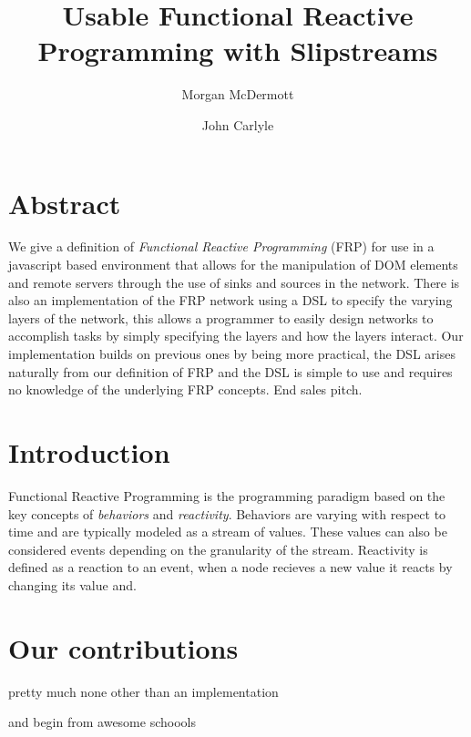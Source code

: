 \documentclass[twocolumn]{paper}
\title{Usable Functional Reactive Programming with Slipstreams}
\author[*]{Morgan McDermott}
\author[**]{John Carlyle}
\affil[*]{University of flightless dragons}
\affil[**]{University of angry bees}
\begin{document}
\maketitle
\section{Abstract}
We give a definition of \textit{Functional Reactive Programming} (FRP) for use in a javascript based environment that allows for the manipulation of DOM elements and remote servers through the use of sinks and sources in the network. There is also an implementation of the FRP network using a DSL to specify the varying layers of the network, this allows a programmer to easily design networks to accomplish tasks by simply specifying the layers and how the layers interact. Our implementation builds on previous ones by being more practical, the DSL arises naturally from our definition of FRP and the DSL is simple to use and requires no knowledge of the underlying FRP concepts. End sales pitch.

\section{Introduction}
Functional Reactive Programming is the programming paradigm based on the key concepts of \textit{behaviors} and \textit{reactivity}. Behaviors are varying with respect to time and are typically modeled as a stream of values. These values can also be considered events depending on the granularity of the stream. Reactivity is defined as a reaction to an event, when a node recieves a new value it reacts by changing its value and. 

\section{Our contributions}
pretty much none other than an implementation

and begin from awesome schoools
\end{document}
